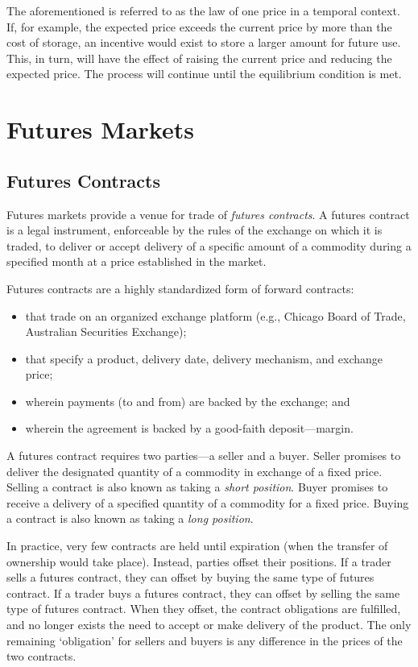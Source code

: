\documentclass[
]{book}
\providecommand{\tightlist}{%
  \setlength{\itemsep}{0pt}\setlength{\parskip}{0pt}}
\begin{document}
The aforementioned is referred to as the law of one price in a temporal context. If, for example, the expected price exceeds the current price by more than the cost of storage, an incentive would exist to store a larger amount for future use. This, in turn, will have the effect of raising the current price and reducing the expected price. The process will continue until the equilibrium condition is met.

\hypertarget{futures-markets}{%
\chapter{Futures Markets}\label{futures-markets}}

\hypertarget{futures-contracts}{%
\section{Futures Contracts}\label{futures-contracts}}

Futures markets provide a venue for trade of \emph{futures contracts}. A futures contract is a legal instrument, enforceable by the rules of the exchange on which it is traded, to deliver or accept delivery of a specific amount of a commodity during a specified month at a price established in the market.

Futures contracts are a highly standardized form of forward contracts:

\begin{itemize}
\tightlist
\item
  that trade on an organized exchange platform (e.g., Chicago Board of Trade, Australian Securities Exchange);
\item
  that specify a product, delivery date, delivery mechanism, and exchange price;
\item
  wherein payments (to and from) are backed by the exchange; and
\item
  wherein the agreement is backed by a good-faith deposit---margin.
\end{itemize}

A futures contract requires two parties---a seller and a buyer. Seller promises to deliver the designated quantity of a commodity in exchange of a fixed price. Selling a contract is also known as taking a \emph{short position}. Buyer promises to receive a delivery of a specified quantity of a commodity for a fixed price. Buying a contract is also known as taking a \emph{long position}.

In practice, very few contracts are held until expiration (when the transfer of ownership would take place). Instead, parties offset their positions. If a trader sells a futures contract, they can offset by buying the same type of futures contract. If a trader buys a futures contract, they can offset by selling the same type of futures contract. When they offset, the contract obligations are fulfilled, and no longer exists the need to accept or make delivery of the product. The only remaining `obligation' for sellers and buyers is any difference in the prices of the two contracts.
\end{document}
